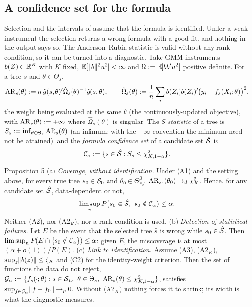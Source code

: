 \subsection{A confidence set for the formula}
\label{sec:prop5}

Selection and the intervals of  assume that the formula is identified. Under a weak instrument the selection returns a wrong formula with a good fit, and nothing in the output says so. The Anderson--Rubin statistic is valid without any rank condition, so it can be turned into a diagnostic. Take GMM instruments $b(Z) \in \mathbb{R}^K$ with $K$ fixed, $\mathbb{E}[\lVert b\rVert^2u^2] < \infty$ and $\Omega := \mathbb{E}[bb'u^2]$ positive definite. For a tree $s$ and $\theta \in \Theta_s$,
\[
\mathrm{AR}_s(\theta) := n\,\hat g(s,\theta)'\hat\Omega_s(\theta)^{-1}\hat g(s,\theta), \qquad \hat\Omega_s(\theta) := \frac1n\sum_ib(Z_i)b(Z_i)'\bigl(y_i - f_s(X_i;\theta)\bigr)^2,
\]
the weight being evaluated at the same $\theta$ (the continuously-updated objective), with $\mathrm{AR}_s(\theta) := +\infty$ where $\hat\Omega_s(\theta)$ is singular. The \emph{S statistic} of a tree is $S_s := \inf_{\theta \in \Theta_s}\mathrm{AR}_s(\theta)$ \citep{stockwright2000} (an infimum: with the $+\infty$ convention the minimum need not be attained), and the \emph{formula confidence set} of a candidate set $\hat{\mathcal{S}}$ is
\begin{equation}
\mathcal{C}_\alpha := \{s \in \hat{\mathcal{S}} : S_s \le \chi^2_{K,1-\alpha}\}.
\label{eq:confset}
\end{equation}

\begin{result}[Proposition5]{Proposition 5}
(a) \emph{Coverage, without identification.} Under (A1) and the setting above, for every true tree $s_0 \in \mathcal{S}_0$ and $\theta_0 \in \Theta_{s_0}^0$, $\mathrm{AR}_{s_0}(\theta_0) \to_d \chi^2_K$. Hence, for any candidate set $\hat{\mathcal{S}}$, data-dependent or not,
\[
\limsup_nP\bigl(s_0 \in \hat{\mathcal{S}},\ s_0 \notin \mathcal{C}_\alpha\bigr) \le \alpha.
\]
Neither (A2), nor (A2$_K$), nor a rank condition is used.
(b) \emph{Detection of statistical failures.} Let $E$ be the event that the selected tree $\hat s$ is wrong while $s_0 \in \hat{\mathcal{S}}$. Then $\limsup_nP(E \cap \{s_0 \notin \mathcal{C}_\alpha\}) \le \alpha$: given $E$, the miscoverage is at most $(\alpha + o(1))/P(E)$.
(c) \emph{Link to identification.} Assume (A3), (A2$_K$), $\sup_z\lVert b(z)\rVert \le \zeta_K$ and (C2) for the identity-weight criterion. Then the set of functions the data do not reject, $\mathcal{G}_\alpha := \{f_s(\cdot;\theta) : s \in \mathcal{S}_L,\ \theta \in \Theta_s,\ \mathrm{AR}_s(\theta) \le \chi^2_{K,1-\alpha}\}$, satisfies $\sup_{f \in \mathcal{G}_\alpha}\lVert f - f_0\rVert \to_p 0$. Without (A2$_K$) nothing forces it to shrink; its width is what the diagnostic measures.
\end{result}

